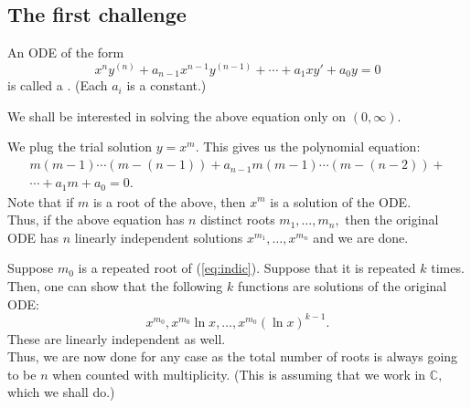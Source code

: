 \subsection{The first challenge} \label{ssec:cauchyeulerhomo}
\begin{mdframed}[style=boxstyle, frametitle={The Setup}]
	An ODE of the form
	\begin{equation*} 
		x^ny^{(n)} + a_{n-1}x^{n-1}y^{(n-1)} + \cdots + a_{1}xy' + a_0y = 0
	\end{equation*}
	is called a . (Each $a_i$ is a constant.)
\end{mdframed}
We shall be interested in solving the above equation only on $(0, \infty).$
\begin{mdframed}[style=boxstyle, frametitle={The Solution}]
	We plug the trial solution $y = x^m.$ This gives us the polynomial equation:
	\begin{align} 
		m(m - 1)\cdots(m-(n-1)) + a_{n-1}m(m-1)\cdots(m-(n-2)) + \nonumber \\
		 \cdots + a_1m + a_0 = 0. \label{eq:indic}
	\end{align}
	Note that if $m$ is a root of the above, then $x^m$ is a solution of the ODE.\\
	Thus, if the above equation has $n$ distinct roots $m_1, \ldots, m_n,$ then the original ODE has $n$ linearly independent solutions $x^{m_1}, \ldots, x^{m_n}$ and we are done.
\end{mdframed}
\begin{mdframed}[style=boxstyle, frametitle={Repeated roots}]
	Suppose $m_0$ is a repeated root of (\ref{eq:indic}). Suppose that it is repeated $k$ times. Then, one can show that the following $k$ functions are solutions of the original ODE:
	\begin{equation*} 
		x^{m_0}, x^{m_0}\ln x, \ldots, x^{m_0}(\ln x)^{k-1}.
	\end{equation*}
	These are linearly independent as well.\\
	Thus, we are now done for any case as the total number of roots is always going to be $n$ when counted with multiplicity. (This is assuming that we work in $\mathbb{C},$ which we shall do.)
\end{mdframed}
